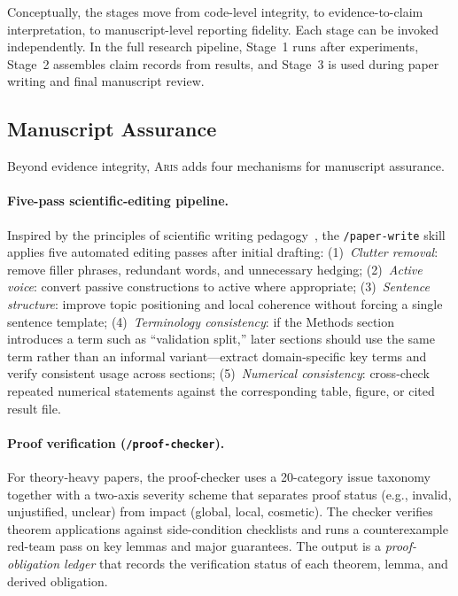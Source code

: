 \documentclass{article}
\newcommand{\aris}{\textsc{Aris}}
\theoremstyle{remark}
\begin{document}
Conceptually, the stages move from code-level integrity, to evidence-to-claim interpretation, to manuscript-level reporting fidelity.
Each stage can be invoked independently.
In the full research pipeline, Stage~1 runs after experiments, Stage~2 assembles claim records from results, and Stage~3 is used during paper writing and final manuscript review.

\subsection{Manuscript Assurance}
\label{sec:manuscript}

Beyond evidence integrity, \aris{} adds four mechanisms for manuscript assurance.

\paragraph{Five-pass scientific-editing pipeline.}
Inspired by the principles of scientific writing pedagogy~\citep{sainani2019writing}, the \texttt{/paper-write} skill applies five automated editing passes after initial drafting:
(1)~\emph{Clutter removal}: remove filler phrases, redundant words, and unnecessary hedging;
(2)~\emph{Active voice}: convert passive constructions to active where appropriate;
(3)~\emph{Sentence structure}: improve topic positioning and local coherence without forcing a single sentence template;
(4)~\emph{Terminology consistency}: if the Methods section introduces a term such as ``validation split,'' later sections should use the same term rather than an informal variant---extract domain-specific key terms and verify consistent usage across sections;
(5)~\emph{Numerical consistency}: cross-check repeated numerical statements against the corresponding table, figure, or cited result file.

\paragraph{Proof verification (\texttt{/proof-checker}).}
For theory-heavy papers, the proof-checker uses a 20-category issue taxonomy together with a two-axis severity scheme that separates proof status (e.g., invalid, unjustified, unclear) from impact (global, local, cosmetic).
The checker verifies theorem applications against side-condition checklists and runs a counterexample red-team pass on key lemmas and major guarantees.
The output is a \emph{proof-obligation ledger} that records the verification status of each theorem, lemma, and derived obligation.
\end{document}
